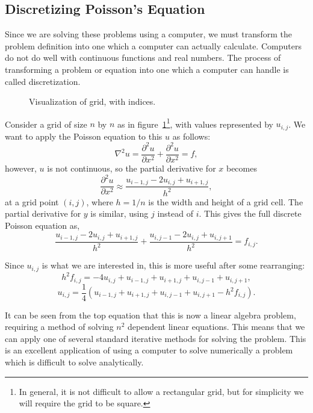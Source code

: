 \subsection{Discretizing Poisson's Equation}

Since we are solving these problems using a computer, we must transform the problem definition into one which a computer
can actually calculate. Computers do not do well with continuous functions and real numbers. The process of transforming
a problem or equation into one which a computer can handle is called discretization.

\begin{figure}[htb]
	\centering
	
	\caption{Visualization of grid, with indices.}
\label{grid}
\end{figure}

Consider a grid of size $n$ by $n$ as in figure~\ref{grid}\footnote{In general, it is not difficult to allow a rectangular grid, but for simplicity
we will require the grid to be square.}, with values represented by $u_{i,j}$. We want to apply the Poisson equation to
this $u$ as follows:
$$\nabla^2 u = \frac{\partial^2 u}{\partial x^2} + \frac{\partial^2 u}{\partial x^2} = f,$$
however, $u$ is not continuous, so the partial derivative for $x$ becomes
$$\frac{\partial^2 u}{\partial x^2} \approx \frac{u_{i-1,j} - 2 u_{i,j} + u_{i+1,j}}{h^2},$$
at a grid point $(i,j)$, where $h = 1 / n$ is the width and height of a grid cell. The partial derivative for $y$ is similar, using $j$ instead of $i$.
This gives the full discrete Poisson equation as\cite{poisson-relax}\cite{myths},
$$\frac{u_{i-1,j} - 2 u_{i,j} + u_{i+1,j}}{h^2} + \frac{u_{i,j-1} - 2 u_{i,j} + u_{i,j+1}}{h^2} = f_{i,j}.$$

Since $u_{i,j}$ is what we are interested in, this is more useful after some rearranging:
$$h^2f_{i,j} = -4u_{i,j} + u_{i-1,j} + u_{i+1,j} + u_{i,j-1} + u_{i,j+1},$$
\begin{equation} \label{eq:poisson}
u_{i,j} = \frac{1}{4}(u_{i-1,j} + u_{i+1,j} + u_{i,j-1} + u_{i,j+1} - h^2f_{i,j}).
\end{equation}

It can be seen from the top equation that this is now a linear algebra problem, requiring a method of solving
$n^2$ dependent linear equations. This means that we can apply one of several standard iterative methods
for solving the problem. This is an excellent application of using a computer to solve numerically a problem
	which is difficult to solve analytically.


